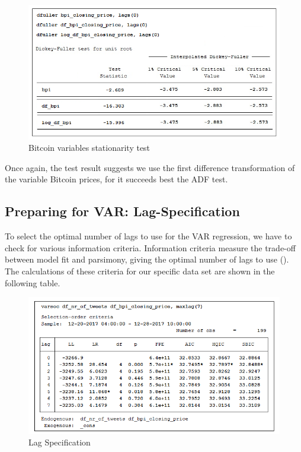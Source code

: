 \documentclass[a4paper,american,12pt]{article}
\begin{document}
\begin{spacing}{1.2}
\begin{figure}[H]
\centering
\includegraphics[scale=0.85]{stata_export_graphs/ADF_bpi_variables.png}
\caption{Bitcoin variables stationarity test}
\label{fig:4}
\end{figure}
	
Once again, the test result suggests we use the first difference transformation of the variable Bitcoin prices, for it succeeds best the ADF test.

\subsection{Preparing for VAR: Lag-Specification}
To select the optimal number of lags to use for the VAR regression, we have to check for various information criteria. Information criteria measure the trade-off between model fit and parsimony, giving the optimal number of lags to use (\cite[p.~27]{brandtwilliams2007}). The calculations of these criteria for our specific data set are shown in the following table.\\

\begin{figure}[H]
\centering
\includegraphics[scale=0.85]{stata_export_graphs/LAG_crit_df_nr_tweets_df_bpi.png}
\caption{Lag Specification}
\label{fig:5}
\end{figure}


\end{spacing}
\end{document}
